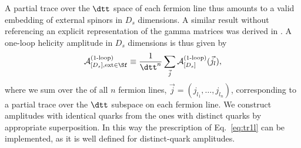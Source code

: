 A partial trace over the $\dtt$ space of each fermion line thus amounts to a valid embedding of external spinors in $D_s$ dimensions. A similar result without referencing an explicit
representation of the gamma matrices was derived in
\cite{DeFreitas:2004kmi,Cullen2010}. A one-loop helicity amplitude in $D_s$ dimensions is thus given by
\begin{align}
  \label{eq:tr1l}
\mathcal{A}_{[D_s],\text{ext}\in \Sf}^{\text{(1-loop)}}\equiv\frac{1}{{\dtt}^n} \sum_{\vec{j}}\mathcal{A}_{[D_s]}^{\text{(1-loop)}}(\vec{j_l}),
\end{align}
where we sum over the \dttindex{} of all $n$ fermion lines,
$\vec{j}=(j_{l_1},\ldots,j_{l_n})$, corresponding to a partial trace over the
$\dtt$ subspace on each fermion line. We construct amplitudes with identical quarks from the ones with distinct quarks by
appropriate superposition. In this way the prescription of Eq.~\eqref{eq:tr1l} can be implemented, as
it is well defined for distinct-quark amplitudes.

